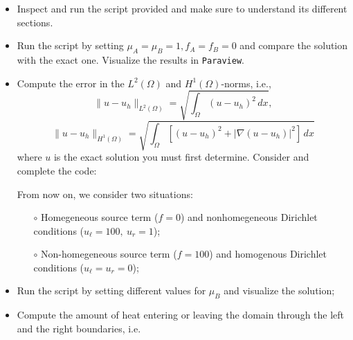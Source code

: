 \begin{kaobox}[frametitle=Implement the following modifications to \texttt{inclusions\_poisson.py}]

\begin{itemize}
\item Inspect and run the script provided and make sure to understand its different sections.\\

\item Run the script by setting $\mu_A = \mu_B = 1, f_A = f_B = 0$ and compare the solution with
the exact one. Visualize the results in \verb+Paraview+. \\

\item Compute the error in the $L^2(\Omega)$ and $H^1(\Omega)$-norms, i.e.,
\begin{equation}
\lVert u - u_h \rVert_{L^2(\Omega)} = \sqrt{\int_{\Omega}{(u-u_h)^2}\,d{x}}, \nonumber
\end{equation}
\begin{equation}
 \lVert u - u_h \rVert_{H^1(\Omega)} = \sqrt{\int_{\Omega}{[(u-u_h)^2 + |\nabla{(u-u_h)}|^2]\,d{x}}} \nonumber
\end{equation}
where $u$ is the exact solution you must first determine. Consider and complete the code:
\begin{center}
\vspace{-0.1cm}
\begin{minipage}{0.85\textwidth}
    
\end{minipage}
\end{center}

From now on, we consider two situations:

\begin{itemize}
 \item[$\circ$] Homegeneous source term ($f = 0$) and nonhomegeneous Dirichlet conditions ($u_{\ell} = 100,~u_r = 1$);
 \item[$\circ$] Non-homegeneous source term ($f=100$) and homogenous Dirichlet conditions ($u_{\ell} = u_{r} = 0$);
\end{itemize}

\item Run the script by setting different values for $\mu_B$ and visualize the solution;\\

\item Compute the amount of heat entering or leaving the domain through the left and the right boundaries, i.e. 
 

\end{itemize}
\end{kaobox}
